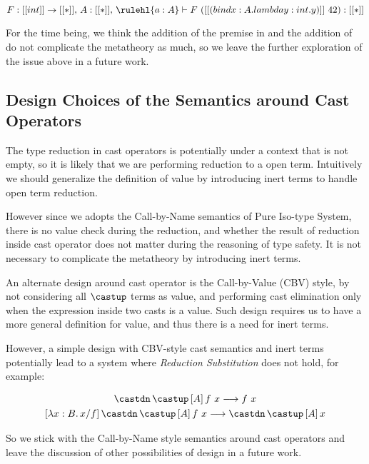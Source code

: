 \begin{equation*}
    F : [[int]] \rightarrow [[*]],\, A : [[*]],\, \rulehl{a : A} \vdash F ~ ([[(bind x : A. lambda y : int. y)]]~ 42) : [[*]]
\end{equation*}

For the time being, we think the addition of the premise in  and
the addition of  do not complicate the metatheory as much, so
we leave the further exploration of the issue above in a future work.

\subsection{Design Choices of the Semantics around Cast Operators}
\label{sec:cast-design}

The type reduction in cast operators is potentially under a context that
is not empty, so it is likely that we are performing reduction to a open term.
Intuitively we should generalize the definition of value by introducing inert
terms\cite{yang2017unifying} to handle open term reduction.

However since we adopts the Call-by-Name semantics of Pure Iso-type System\cite{yang2019pure},
there is no value check during the reduction, and whether the result of reduction
inside cast operator does not matter during the reasoning of type safety. It is
not necessary to complicate the metatheory by introducing inert terms.

An alternate design around cast operator is the Call-by-Value (CBV) style\cite{yang2019pure},
by not considering all $\castup$ terms as value, and performing cast elimination only
when the expression inside two casts is a value. Such design requires us to
have a more general definition for value, and thus there is a need for inert terms.

However, a simple design with CBV-style cast semantics and inert terms
potentially lead to a system where \emph{Reduction Substitution} does not hold,
for example:

\begin{gather*}
    \castdn \, \castup \, [A] \, f ~ x \longrightarrow f ~ x \\
    [\lambda x : B. \, x / f] \, \castdn \, \castup \, [A] \, f ~ x \longrightarrow \castdn \, \castup \, [A] \, x
\end{gather*}

So we stick with the Call-by-Name style semantics around cast operators and
leave the discussion of other possibilities of design in a future work.
